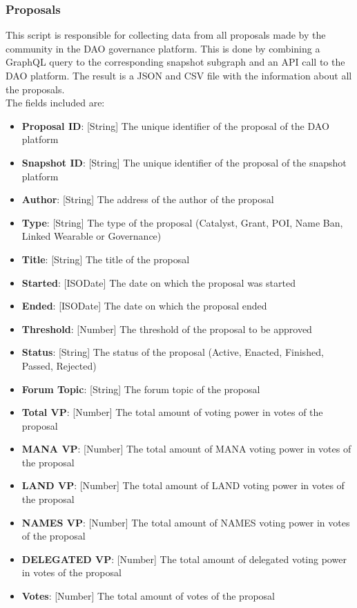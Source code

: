 \documentclass[MSE,Master,english]{twbook}%
\begin{document}
\subsubsection{Proposals\label{proposals-script}}
This script is responsible for collecting data from all proposals made by the community in the DAO governance platform. This is done by combining a GraphQL query to the corresponding snapshot subgraph and an API call to the DAO platform. The result is a JSON and CSV file with the information about all the proposals. \\

The fields included are:
\begin{itemize}
  \item \textbf{Proposal ID}: [String] The unique identifier of the proposal of the DAO platform
  \item \textbf{Snapshot ID}: [String] The unique identifier of the proposal of the snapshot platform
  \item \textbf{Author}: [String] The address of the author of the proposal
  \item \textbf{Type}: [String] The type of the proposal (Catalyst, Grant, POI, Name Ban, Linked Wearable or Governance)
  \item \textbf{Title}: [String] The title of the proposal
  \item \textbf{Started}: [ISODate] The date on which the proposal was started
  \item \textbf{Ended}: [ISODate] The date on which the proposal ended
  \item \textbf{Threshold}: [Number] The threshold of the proposal to be approved
  \item \textbf{Status}: [String] The status of the proposal (Active, Enacted, Finished, Passed, Rejected)
  \item \textbf{Forum Topic}: [String] The forum topic of the proposal
  \item \textbf{Total VP}: [Number] The total amount of voting power in votes of the proposal
  \item \textbf{MANA VP}: [Number] The total amount of MANA voting power in votes of the proposal
  \item \textbf{LAND VP}: [Number] The total amount of LAND voting power in votes of the proposal
  \item \textbf{NAMES VP}: [Number] The total amount of NAMES voting power in votes of the proposal
  \item \textbf{DELEGATED VP}: [Number] The total amount of delegated voting power in votes of the proposal
  \item \textbf{Votes}: [Number] The total amount of votes of the proposal
\end{itemize}
\end{document}
